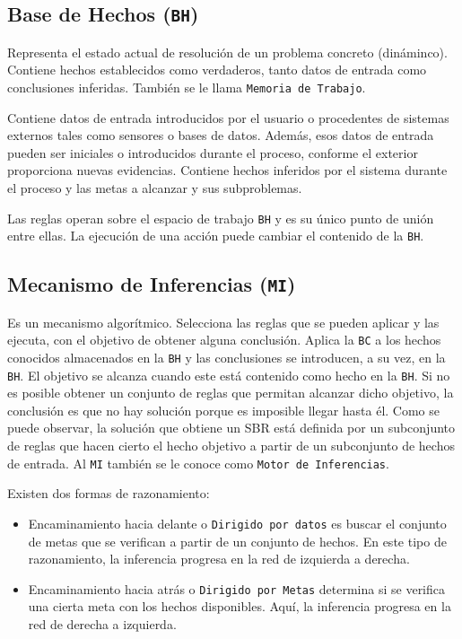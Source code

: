 	\subsection{Base de Hechos (\texttt{BH})}
	\par Representa el estado actual de resolución de un problema concreto (dináminco). Contiene hechos establecidos como verdaderos, tanto datos de entrada como conclusiones inferidas.
	También se le llama \texttt{Memoria de Trabajo}.
	\par Contiene datos de entrada introducidos por el usuario o procedentes de sistemas externos tales como sensores o bases de datos. Además,
	esos datos de entrada pueden ser iniciales o introducidos durante el proceso, conforme el exterior proporciona
	nuevas evidencias. Contiene hechos inferidos por el sistema durante el proceso y las metas a alcanzar y sus subproblemas.
	\par Las reglas operan sobre el espacio de trabajo \texttt{BH} y es su único punto de unión entre ellas. La ejecución de una acción puede cambiar el contenido de la \texttt{BH}.

	\subsection{Mecanismo de Inferencias (\texttt{MI})}
	\par Es un mecanismo algorítmico. Selecciona las reglas que se pueden aplicar y las ejecuta, con el objetivo 
	de obtener alguna conclusión. Aplica la \texttt{BC} a los hechos conocidos almacenados en la \texttt{BH} y las conclusiones se 
	introducen, a su vez, en la \texttt{BH}. El objetivo se alcanza cuando este está contenido como hecho en la \texttt{BH}. 
	Si no es posible obtener un conjunto de reglas que permitan alcanzar dicho objetivo, la conclusión es que no hay solución porque es imposible llegar hasta él.
	Como se puede observar, la solución que obtiene un SBR está definida por un subconjunto de reglas que hacen cierto el hecho
	objetivo a partir de un subconjunto de hechos de entrada. Al \texttt{MI} también se le conoce como \texttt{Motor de Inferencias}.
	\par Existen dos formas de razonamiento:
	\begin{itemize}
		\item Encaminamiento hacia delante o \texttt{Dirigido por datos} es buscar el conjunto de metas que se verifican a partir de un conjunto de hechos.
	En este tipo de razonamiento, la inferencia progresa en la red de izquierda a derecha.
		\item Encaminamiento hacia atrás o \texttt{Dirigido por Metas} determina si se verifica una cierta meta con los hechos disponibles. Aquí,
	la inferencia progresa en la red de derecha a izquierda.
	\end{itemize}

